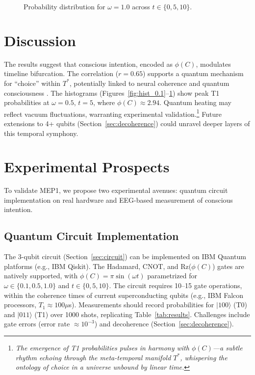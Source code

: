 \documentclass[a4paper,12pt]{article}
\begin{document}
\begin{figure}[h]
\centering
{}
\caption{Probability distribution for $\omega = 1.0$ across $t \in \{0, 5, 10\}$.}
\label{fig:hist_1.0}
\end{figure}

\section{Discussion}
The results suggest that conscious intention, encoded as $\phi(C)$, modulates timeline bifurcation. The correlation ($r = 0.65$) supports a quantum mechanism for ``choice'' within $T^*$, potentially linked to neural coherence \cite{lutz2004} and quantum consciousness \cite{penrose1994}. The histograms (Figures~\ref{fig:hist_0.1}--\ref{fig:hist_1.0}) show peak T1 probabilities at $\omega = 0.5$, $t = 5$, where $\phi(C) \approx 2.94$. Quantum heating may reflect vacuum fluctuations, warranting experimental validation.\footnote{\emph{The emergence of T1 probabilities pulses in harmony with $\phi(C)$---a subtle rhythm echoing through the meta-temporal manifold $T^*$, whispering the ontology of choice in a universe unbound by linear time.}} Future extensions to 4+ qubits (Section~\ref{sec:decoherence}) could unravel deeper layers of this temporal symphony.

\section{Experimental Prospects}
To validate MEP1, we propose two experimental avenues: quantum circuit implementation on real hardware and EEG-based measurement of conscious intention.

\subsection{Quantum Circuit Implementation}
The 3-qubit circuit (Section~\ref{sec:circuit}) can be implemented on IBM Quantum platforms (e.g., IBM Qiskit). The Hadamard, CNOT, and Rz($\phi(C)$) gates are natively supported, with $\phi(C) = \pi \sin(\omega t)$ parametrized for $\omega \in \{0.1, 0.5, 1.0\}$ and $t \in \{0, 5, 10\}$. The circuit requires 10--15 gate operations, within the coherence times of current superconducting qubits (e.g., IBM Falcon processors, $T_1 \approx 100 \mu$s). Measurements should record probabilities for $|100\rangle$ (T0) and $|011\rangle$ (T1) over 1000 shots, replicating Table~\ref{tab:results}. Challenges include gate errors (error rate $\approx 10^{-3}$) and decoherence (Section~\ref{sec:decoherence}).
\end{document}
